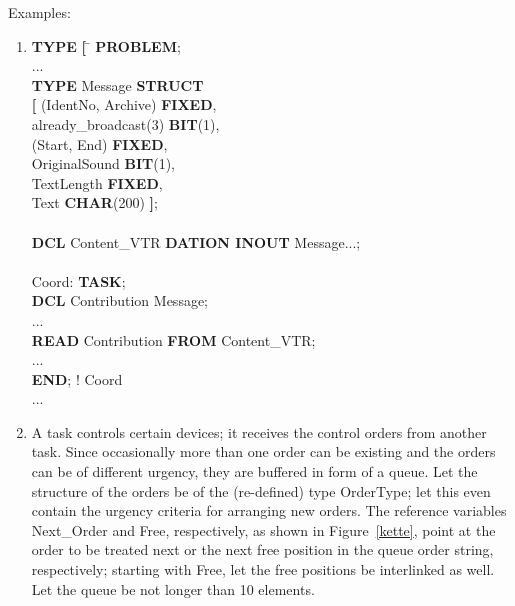 Examples:
\begin{enumerate}
\item
\begin{tabbing}
\x \= {\bf TYPE} \= {\bf [} \= \kill
{\bf PROBLEM}; \> \> \> \\
  \> ... \> \> \\
  \> {\bf TYPE} \>         \> Message {\bf STRUCT}\\
  \>            \> {\bf [} \> (IdentNo, Archive) {\bf FIXED},\\
  \>            \>         \> already\_broadcast(3) {\bf BIT}(1),\\
  \>            \>         \> (Start, End) {\bf FIXED},\\
  \>            \>         \> OriginalSound {\bf BIT}(1),\\
  \>            \>         \> TextLength {\bf FIXED},\\
  \>            \>         \> Text {\bf CHAR}(200) {\bf ]};\\
  \>            \>         \> \\
  \> {\bf DCL}  \>         \> Content\_VTR {\bf DATION INOUT} Message...;\\
  \>            \>         \> \\
  \> Coord:     \>         \> {\bf TASK};\\
  \>            \>         \> {\bf DCL} Contribution Message;\\
  \>            \>         \> ...\\
  \>            \>         \> {\bf READ} Contribution {\bf FROM} Content\_VTR;\\
  \>            \>         \> ...\\
  \>            \>         \> {\bf END}; ! Coord\\
  \> ...        \>         \>
\end{tabbing}
\item A task controls certain devices; it receives the control orders
from another task. Since occasionally more than one order can be
existing and the orders can be of different urgency, they are buffered
in form of a queue. Let the structure of the orders be of the (re-defined)
type OrderType; let this even contain the urgency criteria for
arranging new orders. The reference variables Next\_Order and Free,
respectively, as shown in Figure~\ref{kette}, point at the order to be treated next or the next free position
in the queue order string, respectively; starting with Free, let the free
positions be interlinked as well. Let the queue be not longer than 10
elements.



\end{enumerate}

